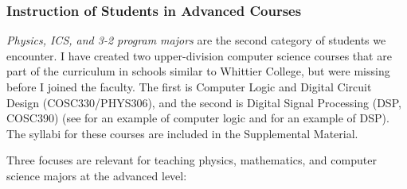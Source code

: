 \documentclass[../../../main.tex]{subfiles}
\begin{document}
\subsubsection{Instruction of Students in Advanced Courses}

\textit{Physics, ICS, and 3-2 program majors} are the second category of students we encounter.  I have created two upper-division computer science courses that are part of the curriculum in schools similar to Whittier College, but were missing before I joined the faculty.  The first is Computer Logic and Digital Circuit Design (COSC330/PHYS306), and the second is Digital Signal Processing (DSP, COSC390) (see \cite{hmc} for an example of computer logic and \cite{rio_hondo} for an example of DSP).  The syllabi for these courses are included in the Supplemental Material.
\\
\vspace{0.25cm}

Three focuses are relevant for teaching physics, mathematics, and computer science majors at the advanced level:
\end{document}
